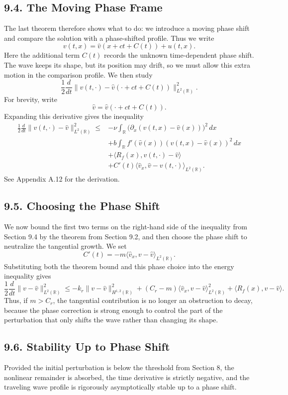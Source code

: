 \documentclass[11pt]{article}
\theoremstyle{definition}
\theoremstyle{remark}
\begin{document}
\subsection*{9.4. The Moving Phase Frame}
The last theorem therefore shows what to do: we introduce a moving phase shift and compare the solution with a phase-shifted profile. Thus we write
\[
v(t,x)=\hat v(x+ct+C(t))+u(t,x).
\]
Here the additional term $C(t)$ records the unknown time-dependent phase shift. The wave keeps its shape, but its position may drift, so we must allow this extra motion in the comparison profile.
We then study
\[
\frac12\frac{d}{dt}\|v(t,\cdot)-\hat v(\cdot+ct+C(t))\|_{L^2(\mathbb R)}^2.
\]
For brevity, write
\[
\hat v=\hat v(\cdot+ct+C(t)).
\]
Expanding this derivative gives the inequality
\[
\begin{aligned}
\frac12\frac{d}{dt}\|v(t,\cdot)-\hat v\|_{L^2(\mathbb R)}^2
\leq{}&-\nu\int_{\mathbb R}\bigl(\partial_x(v(t,x)-\hat v(x))\bigr)^2\,dx \\
&+b\int_{\mathbb R} f'(\hat v(x))(v(t,x)-\hat v(x))^2\,dx \\
&+\langle R_f(x),v(t,\cdot)-\hat v\rangle \\
&+C'(t)\langle \hat v_x,\hat v-v(t,\cdot)\rangle_{L^2(\mathbb R)}.
\end{aligned}
\]
See Appendix A.12 for the derivation.

\subsection*{9.5. Choosing the Phase Shift}
We now bound the first two terms on the right-hand side of the inequality from Section 9.4 by the theorem from Section 9.2, and then choose the phase shift to neutralize the tangential growth. We set
\[
C'(t)=-m\langle \hat v_x,v-\hat v\rangle_{L^2(\mathbb R)}.
\]
Substituting both the theorem bound and this phase choice into the energy inequality gives
\[
\frac12\frac{d}{dt}\|v-\hat v\|_{L^2(\mathbb R)}^2
\leq
-k_r\|v-\hat v\|_{H^{1,2}(\mathbb R)}^2
+(C_r-m)\langle \hat v_x,v-\hat v\rangle_{L^2(\mathbb R)}^2
+\langle R_f(x),v-\hat v\rangle.
\]
Thus, if $m>C_r$, the tangential contribution is no longer an obstruction to decay, because the phase correction is strong enough to control the part of the perturbation that only shifts the wave rather than changing its shape.

\subsection*{9.6. Stability Up to Phase Shift}
Provided the initial perturbation is below the threshold from Section 8, the nonlinear remainder is absorbed, the time derivative is strictly negative, and the traveling wave profile is rigorously asymptotically stable up to a phase shift.
\end{document}
